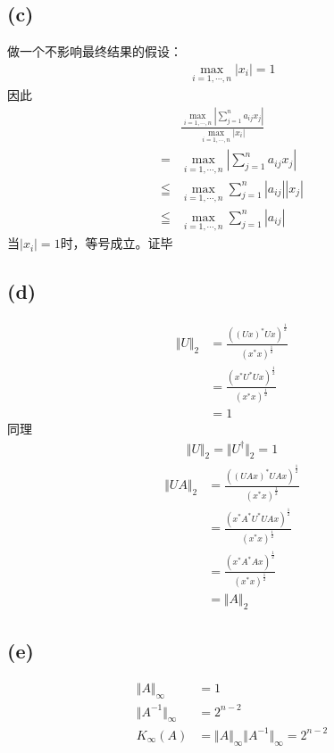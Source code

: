 \documentclass{article}
\numberwithin{equation}{section}
\begin{document}
\subsection*{(c)}
做一个不影响最终结果的假设：
\begin{align}
    \max_{i=1,\cdots,n}\left| x_i \right|=1
\end{align}
因此
\begin{align}
          & \frac{\max_{i=1,\cdots,n}\left|\sum_{j=1}^n a_{ij}x_j\right|}{\max_{i=1,\cdots,n}\left|x_i\right|} \\
    =     & \max_{i=1,\cdots,n}\left|\sum_{j=1}^n a_{ij}x_j\right|                                             \\
    \leqq & \max_{i=1,\cdots,n}\sum_{j=1}^n \left|a_{ij}\right|\left|x_j\right|                                \\
    \leqq & \max_{i=1,\cdots,n}\sum_{j=1}^n \left|a_{ij}\right|
\end{align}
当$\left| x_i \right|=1$时，等号成立。证毕
\subsection*{(d)}
\begin{align}
    \Vert U\Vert_2 & =\frac{\left(\left(Ux\right)^*Ux\right)^{\frac{1}{2}}}{\left(x^*x\right)^{\frac{1}{2}}} \\
                   & =\frac{\left(x^*U^*Ux\right)^{\frac{1}{2}}}{\left(x^*x\right)^{\frac{1}{2}}}            \\
                   & =1
\end{align}
同理
\begin{align}
    \Vert U\Vert_2=\Vert U^\dagger\Vert_2=1
\end{align}
\begin{align}
    \Vert UA\Vert_2 & =\frac{\left(\left(UAx\right)^*UAx\right)^{\frac{1}{2}}}{\left(x^*x\right)^{\frac{1}{2}}} \\
                    & =\frac{\left(x^*A^*U^*UAx\right)^{\frac{1}{2}}}{\left(x^*x\right)^{\frac{1}{2}}}          \\
                    & =\frac{\left(x^*A^*Ax\right)^{\frac{1}{2}}}{\left(x^*x\right)^{\frac{1}{2}}}              \\
                    & =\Vert A\Vert_2
\end{align}
\subsection*{(e)}
\begin{align}
    \Vert A\Vert_\infty      & =1                                                   \\
    \Vert A^{-1}\Vert_\infty & =2^{n-2}                                             \\
    K_\infty\left(A\right)   & =\Vert A\Vert_\infty\Vert A^{-1}\Vert_\infty=2^{n-2}
\end{align}
\end{document}
